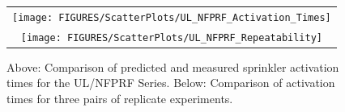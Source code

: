 \begin{figure}[p]
\begin{center}
\begin{tabular}{c}
\texttt{[image: FIGURES/ScatterPlots/UL\_NFPRF\_Activation\_Times]} \\
\texttt{[image: FIGURES/ScatterPlots/UL\_NFPRF\_Repeatability]}
\end{tabular}
\end{center}
\caption{Above: Comparison of predicted and measured sprinkler activation times for the UL/NFPRF Series. Below: Comparison of activation
times for three pairs of replicate experiments.}
\label{UL_NFPRF}
\end{figure}


